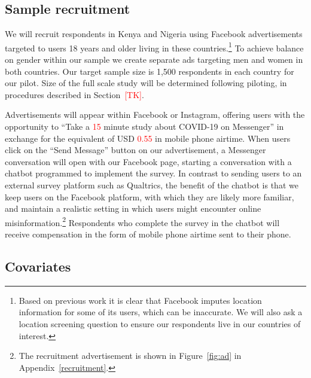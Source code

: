 \documentclass[letterpaper, 12pt, parskip=full,]{scrartcl}
\begin{document}
\subsection{Sample recruitment}
We will recruit respondents in Kenya and Nigeria using Facebook advertisements targeted to users 18 years and older living in these countries.\footnote{Based on previous work it is clear that Facebook imputes location information for some of its users, which can be inaccurate. We will also ask a location screening question to ensure our respondents live in our countries of interest.} To achieve balance on gender within our sample we create separate ads targeting men and women in both countries. Our target sample size is 1,500 respondents in each country for our pilot. Size of the full scale study will be determined following piloting, in procedures described in Section~\textcolor{red}{[TK]}.


Advertisements will appear within Facebook or Instagram, offering users with the opportunity to ``Take a \textcolor{red}{15} minute study about COVID-19 on Messenger'' in exchange for the equivalent of USD \textcolor{red}{0.55} in mobile phone airtime. When users click on the ``Send Message'' button on our advertisement, a Messenger conversation will open with our Facebook page, starting a conversation with a chatbot programmed to implement the survey. In contrast to sending users to an external survey platform such as Qualtrics, the benefit of the chatbot is that we keep users on the Facebook platform, with which they are likely more familiar, and maintain a realistic setting in which users might encounter online misinformation.\footnote{The recruitment advertisement is shown in Figure~\ref{fig:ad} in Appendix~\ref{recruitment}. \color{red}{[[Add images of chatbot once linked to page]]}} Respondents who complete the survey in the chatbot will receive compensation in the form of mobile phone airtime sent to their phone. %

\subsection{Covariates}
\end{document}
